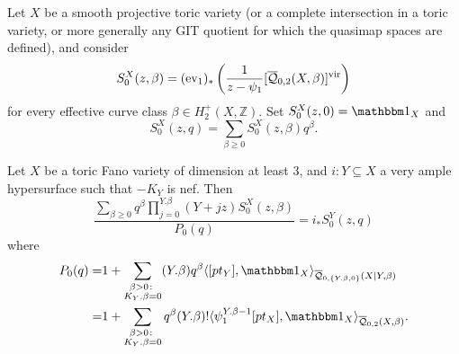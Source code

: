 \begin{dfn}
 Let $X$ be a smooth projective toric variety (or a complete intersection in a toric variety, or more generally any GIT quotient for which the quasimap spaces are defined), and consider 
 \[
  S_0^X(z,\beta)=(\operatorname{ev}_1)_*\left(\frac{1}{z-\psi_1}[\overline{\mathcal Q}_{0,2}(X,\beta)]^\text{vir}\right)
 \]
 for every effective curve class $\beta\in H_2^+(X,\mathbb Z)$. Set $S_0^X(z,0)= \mathbbm 1_X$ and
 \[
  S_0^X(z,q)=\sum_{\beta\geq 0}S_0^X(z,\beta) q^\beta.
 \]
\end{dfn}

\begin{thm}
Let $X$ be a toric Fano variety of dimension at least 3, and $i\colon Y\subseteq X$ a very ample hypersurface such that $-K_Y$ is nef. Then
\begin{equation}\label{eqn:mirror}
   \frac{\sum_{\beta\geq 0} q^\beta\prod_{j=0}^{Y.\beta}(Y+jz)S_0^X(z,\beta)}{P_0(q)}= i_*S_0^Y(z,q)
\end{equation}
where
\begin{align*}
 P_0(q)= & 1+\sum_{\substack{\beta>0\colon \\ K_Y.\beta=0}} (Y.\beta)q^\beta\langle [pt_Y],\mathbbm 1_{X}\rangle_{\Q{0}{\{Y.\beta,0\}}{X|Y}{\beta}} \\
 = & 1+\sum_{\substack{\beta>0\colon \\ K_Y.\beta=0}} q^\beta(Y.\beta)!\langle\psi_1^{Y.\beta-1}[pt_X],\mathbbm 1_{X}\rangle_{\Q{0}{2}{X}{\beta}}.
\end{align*}
\end{thm}

